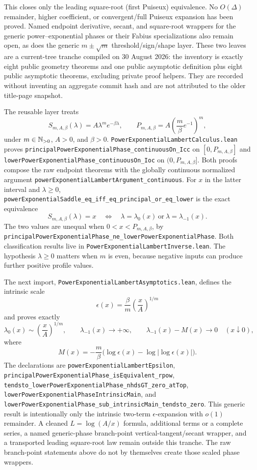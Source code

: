 \documentclass[11pt,oneside]{article}
\theoremstyle{definition}
\theoremstyle{remark}
\begin{document}
This closes only the leading square-root (first Puiseux) equivalence.  No
\(O(\Delta)\) remainder, higher coefficient, or convergent/full Puiseux
expansion has been proved.  Named endpoint derivative, secant, and
square-root wrappers for the generic power--exponential phases or their
Fabius specializations also remain open, as does the generic
\(m\mathbin{\pm}\sqrt m\) threshold/sign/shape layer.
These two leaves are a current-tree tranche compiled on 30 August 2026:
the inventory is exactly eight public geometry theorems and one public
asymptotic definition plus eight public asymptotic theorems, excluding
private proof helpers.  They are recorded without inventing an aggregate
commit hash and are not attributed to the older title-page snapshot.

The reusable layer treats
\[
  S_{m,A,\beta}(\lambda)=A\lambda^m e^{-\beta\lambda},
  \qquad
  P_{m,A,\beta}
    =A\left(\frac m\beta e^{-1}\right)^m,
\]
under \(m\in\mathbb{N}_{>0}\), \(A>0\), and \(\beta>0\).
\nolinkurl{PowerExponentialLambertCalculus.lean} proves
\nolinkurl{principalPowerExponentialPhase_continuousOn_Icc} on
\([0,P_{m,A,\beta}]\) and
\nolinkurl{lowerPowerExponentialPhase_continuousOn_Ioc} on
\((0,P_{m,A,\beta}]\).  Both proofs compose the raw endpoint theorems with
the globally continuous normalized argument
\nolinkurl{powerExponentialLambertArgument_continuous}.  For \(x\) in the
latter interval and
\(\lambda\ge0\),
\nolinkurl{powerExponentialSaddle_eq_iff_eq_principal_or_eq_lower} is the
exact equivalence
\[
 S_{m,A,\beta}(\lambda)=x
 \quad\Longleftrightarrow\quad
 \lambda=\lambda_0(x)\ \text{or}\ \lambda=\lambda_{-1}(x).
\]
The two values are unequal when \(0<x<P_{m,A,\beta}\), by
\nolinkurl{principalPowerExponentialPhase_ne_lowerPowerExponentialPhase}.
Both classification results live in
\nolinkurl{PowerExponentialLambertInverse.lean}.  The hypothesis
\(\lambda\ge0\) matters when \(m\) is even, because negative inputs can
produce further positive profile values.

The next import,
\nolinkurl{PowerExponentialLambertAsymptotics.lean}, defines the intrinsic
scale
\[
 \epsilon(x)=\frac{\beta}{m}\left(\frac{x}{A}\right)^{1/m}
\]
and proves exactly
\[
 \lambda_0(x)\sim\left(\frac{x}{A}\right)^{1/m},\qquad
 \lambda_{-1}(x)\longrightarrow+\infty,\qquad
 \lambda_{-1}(x)-M(x)\longrightarrow0
 \quad(x\downarrow0),
\]
where
\[
 M(x)=-\frac m\beta
 \bigl(\log\epsilon(x)-\log|\log\epsilon(x)|\bigr).
\]
The declarations are
\nolinkurl{powerExponentialLambertEpsilon},
\nolinkurl{principalPowerExponentialPhase_isEquivalent_rpow},
\nolinkurl{tendsto_lowerPowerExponentialPhase_nhdsGT_zero_atTop},
\nolinkurl{lowerPowerExponentialPhaseIntrinsicMain}, and
\nolinkurl{lowerPowerExponentialPhase_sub_intrinsicMain_tendsto_zero}.
This generic result is intentionally only the intrinsic two-term
\(\epsilon\)-expansion with \(o(1)\) remainder.  A cleaned
\(L=\log(A/x)\) formula, additional terms or a complete series, a
named generic-phase branch-point vertical-tangent/secant wrapper, and a
transported leading square-root law remain outside this tranche.  The raw
branch-point statements above do not by themselves create those scaled
phase wrappers.
\end{document}
